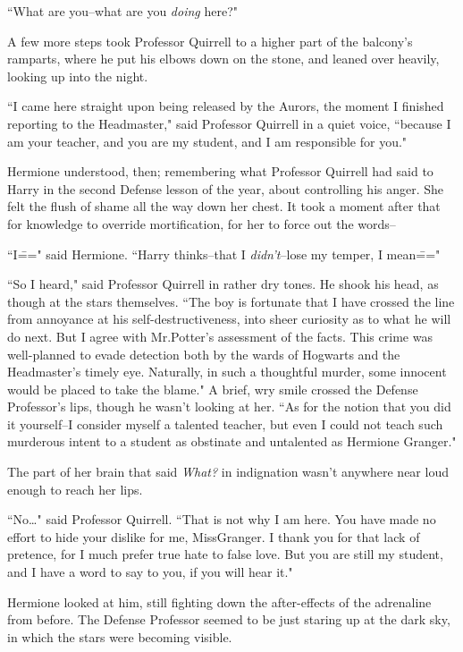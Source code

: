 ``What are you\---what are you \emph{doing} here?"

A few more steps took Professor Quirrell to a higher part of the balcony's ramparts, where he put his elbows down on the stone, and leaned over heavily, looking up into the night.

``I came here straight upon being released by the Aurors, the moment I finished reporting to the Headmaster," said Professor Quirrell in a quiet voice, ``because I am your teacher, and you are my student, and I am responsible for you."

Hermione understood, then; remembering what Professor Quirrell had said to Harry in the second Defense lesson of the year, about controlling his anger. She felt the flush of shame all the way down her chest. It took a moment after that for knowledge to override mortification, for her to force out the words\---

``I\===" said Hermione. ``Harry thinks\---that I \emph{didn't}\---lose my temper, I mean\==="

``So I heard," said Professor Quirrell in rather dry tones. He shook his head, as though at the stars themselves. ``The boy is fortunate that I have crossed the line from annoyance at his self-destructiveness, into sheer curiosity as to what he will do next. But I agree with Mr.\?Potter's assessment of the facts. This crime was well-planned to evade detection both by the wards of Hogwarts and the Headmaster's timely eye. Naturally, in such a thoughtful murder, some innocent would be placed to take the blame." A brief, wry smile crossed the Defense Professor's lips, though he wasn't looking at her. ``As for the notion that you did it yourself\---I consider myself a talented teacher, but even I could not teach such murderous intent to a student as obstinate and untalented as Hermione Granger."

The part of her brain that said \emph{What?} in indignation wasn't anywhere near loud enough to reach her lips.

``No{\ldots}" said Professor Quirrell. ``That is not why I am here. You have made no effort to hide your dislike for me, Miss\?Granger. I thank you for that lack of pretence, for I much prefer true hate to false love. But you are still my student, and I have a word to say to you, if you will hear it."

Hermione looked at him, still fighting down the after-effects of the adrenaline from before. The Defense Professor seemed to be just staring up at the dark sky, in which the stars were becoming visible.


